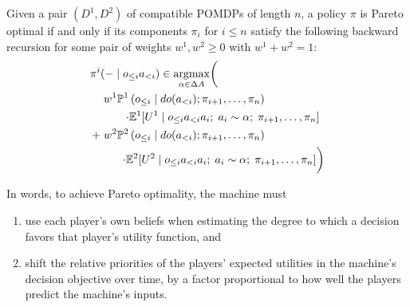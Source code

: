 \documentclass{article}
\newcommand{\hist}[1]{o_{\le #1}a_{<#1}}
\newcommand{\dohist}[1]{o_{\le #1} \mid do(a_{<#1})}
\DeclareMathOperator*{\argmax}{argmax}
\begin{document}
\begin{theorem}\label{thm:main}
Given a pair $(D^1,D^2)$ of compatible POMDPs of length $n$, a policy $\pi$ is Pareto optimal if and only if its components $\pi_i$ for $i\le n$ satisfy the following backward recursion for some pair of weights $w^1,w^2\geq 0$ with $w^1+w^2=1$:
\begin{align*}
\pi^i&(-\mid\hist{i}) \in \argmax_{\alpha\in\Delta A} \biggl(\vphantom{\left(\left(\right)\right)}\biggr.\\
 &\left.w^1 \PP^1\left(\dohist{i}; \pi_{i+1},\ldots,\pi_n\right)\right. \\ 
 & \quad \quad \left.\cdot \EE^1[U^1 \mid \hist{i} a_i ;\; a_i\sim \alpha;\; \pi_{i+1},\ldots,\pi_n]\right.\\
+ &\left.w^2 \PP^2\left(\dohist{i}; \pi_{i+1},\ldots,\pi_n\right)\right. \\ 
& \quad \quad \biggl.\cdot \EE^2[U^2 \mid \hist{i} a_i;\; a_i\sim \alpha;\; \pi_{i+1},\ldots,\pi_n] \biggr)
\end{align*}

In words, to achieve Pareto optimality, the machine must
\begin{enumerate}
\item use each player's own beliefs when estimating the degree to which a decision favors that player's utility function, and
\item shift the relative priorities of the players' expected utilities in the machine's decision objective over time, by a factor proportional to how well the players predict the machine's inputs.
\end{enumerate}
\end{theorem}
\end{document}
